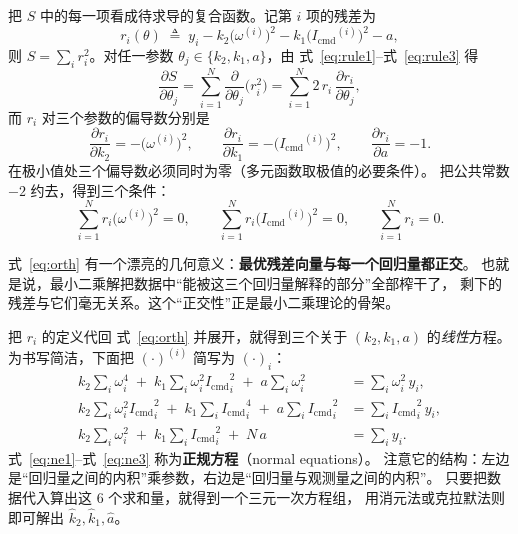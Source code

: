 \documentclass[cn,blue,11pt,device=normal]{elegantnote}
\newcommand{\Icmd}{I_{\mathrm{cmd}}{}}
\newcommand{\fref}[1]{式~\eqref{#1}}
\begin{document}
把 $S$ 中的每一项看成待求导的复合函数。记第 $i$ 项的残差为
\begin{equation}
  r_i(\theta) \;\triangleq\; y_i - k_2\bigl(\omega^{(i)}\bigr)^2 - k_1\bigl(\Icmd^{(i)}\bigr)^2 - a ,
\end{equation}
则 $S=\sum_i r_i^2$。对任一参数 $\theta_j\in\{k_2,k_1,a\}$，由 \fref{eq:rule1}--\fref{eq:rule3} 得
\begin{equation}
  \frac{\partial S}{\partial \theta_j}
  = \sum_{i=1}^{N}\frac{\partial}{\partial \theta_j}\bigl(r_i^2\bigr)
  = \sum_{i=1}^{N} 2\,r_i\,\frac{\partial r_i}{\partial \theta_j},
\end{equation}
而 $r_i$ 对三个参数的偏导数分别是
\begin{equation}
  \frac{\partial r_i}{\partial k_2} = -\bigl(\omega^{(i)}\bigr)^2,\qquad
  \frac{\partial r_i}{\partial k_1} = -\bigl(\Icmd^{(i)}\bigr)^2,\qquad
  \frac{\partial r_i}{\partial a} = -1 .
\end{equation}
在极小值处三个偏导数必须同时为零（多元函数取极值的必要条件）。
把公共常数 $-2$ 约去，得到三个条件：
\begin{equation}\label{eq:orth}
  \boxed{\;
  \sum_{i=1}^{N} r_i\bigl(\omega^{(i)}\bigr)^2 = 0,\qquad
  \sum_{i=1}^{N} r_i\bigl(\Icmd^{(i)}\bigr)^2 = 0,\qquad
  \sum_{i=1}^{N} r_i = 0 .
  \;}
\end{equation}

\fref{eq:orth} 有一个漂亮的几何意义：\textbf{最优残差向量与每一个回归量都正交}。
也就是说，最小二乘解把数据中“能被这三个回归量解释的部分”全部榨干了，
剩下的残差与它们毫无关系。这个“正交性”正是最小二乘理论的骨架。

把 $r_i$ 的定义代回 \fref{eq:orth} 并展开，就得到三个关于 $(k_2,k_1,a)$ 的\emph{线性}方程。
为书写简洁，下面把 $(\cdot)^{(i)}$ 简写为 $(\cdot)_i$：
\begin{align}
  k_2\sum_i \omega_i^4 \;+\; k_1\sum_i \omega_i^2{\Icmd}_i^2 \;+\; a\sum_i \omega_i^2
    &= \sum_i \omega_i^2\,y_i,\label{eq:ne1}\\
  k_2\sum_i \omega_i^2{\Icmd}_i^2 \;+\; k_1\sum_i {\Icmd}_i^4 \;+\; a\sum_i {\Icmd}_i^2
    &= \sum_i {\Icmd}_i^2\,y_i,\label{eq:ne2}\\
  k_2\sum_i \omega_i^2 \;+\; k_1\sum_i {\Icmd}_i^2 \;+\; N\,a
    &= \sum_i y_i .\label{eq:ne3}
\end{align}
\fref{eq:ne1}--\fref{eq:ne3} 称为\textbf{正规方程}（normal equations）。
注意它的结构：左边是“回归量之间的内积”乘参数，右边是“回归量与观测量之间的内积”。
只要把数据代入算出这 6 个求和量，就得到一个三元一次方程组，
用消元法或克拉默法则即可解出 $\hat k_2,\hat k_1,\hat a$。
\end{document}
